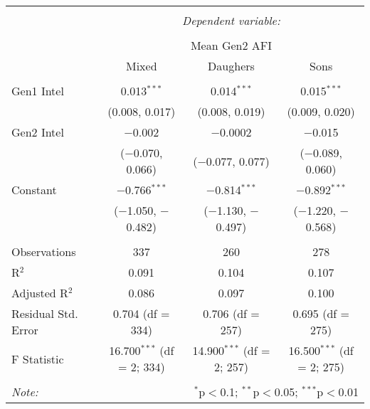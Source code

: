 
\begingroup 
\small 
\begin{tabular}{@{\extracolsep{1pt}}lccc} 
\\[-1.8ex]\hline 
\hline \\[-1.8ex] 
 & \multicolumn{3}{c}{\textit{Dependent variable:}} \\ 
\cline{2-4} 
\\[-1.8ex] & \multicolumn{3}{c}{Mean Gen2 AFI} \\ 
 & Mixed & Daughers & Sons \\ 
\hline \\[-1.8ex] 
 Gen1 Intel & 0.013$^{***}$ & 0.014$^{***}$ & 0.015$^{***}$ \\ 
  & (0.008, 0.017) & (0.008, 0.019) & (0.009, 0.020) \\ 
  Gen2 Intel & $-$0.002 & $-$0.0002 & $-$0.015 \\ 
  & ($-$0.070, 0.066) & ($-$0.077, 0.077) & ($-$0.089, 0.060) \\ 
  Constant & $-$0.766$^{***}$ & $-$0.814$^{***}$ & $-$0.892$^{***}$ \\ 
  & ($-$1.050, $-$0.482) & ($-$1.130, $-$0.497) & ($-$1.220, $-$0.568) \\ 
 \hline \\[-1.8ex] 
Observations & 337 & 260 & 278 \\ 
R$^{2}$ & 0.091 & 0.104 & 0.107 \\ 
Adjusted R$^{2}$ & 0.086 & 0.097 & 0.100 \\ 
Residual Std. Error & 0.704 (df = 334) & 0.706 (df = 257) & 0.695 (df = 275) \\ 
F Statistic & 16.700$^{***}$ (df = 2; 334) & 14.900$^{***}$ (df = 2; 257) & 16.500$^{***}$ (df = 2; 275) \\ 
\hline 
\hline \\[-1.8ex] 
\textit{Note:}  & \multicolumn{3}{r}{$^{*}$p$<$0.1; $^{**}$p$<$0.05; $^{***}$p$<$0.01} \\ 
\end{tabular} 
\endgroup 
